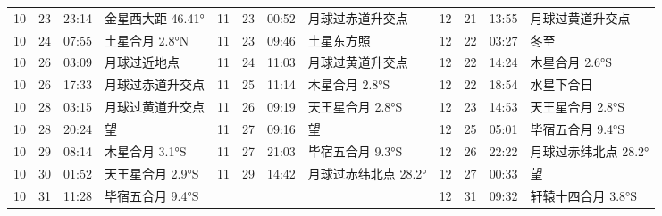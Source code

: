 \begin{tabular}{llll|llll|llll}
10 & 23 & 23:14 & 金星西大距 46.41° & 11 & 23 & 00:52 & 月球过赤道升交点 & 12 & 21 & 13:55 & 月球过黄道升交点 \tabularnewline
10 & 24 & 07:55 & 土星合月 2.8°N & 11 & 23 & 09:46 & 土星东方照 & 12 & 22 & 03:27 & 冬至 \tabularnewline
10 & 26 & 03:09 & 月球过近地点 & 11 & 24 & 11:03 & 月球过黄道升交点 & 12 & 22 & 14:24 & 木星合月 2.6°S \tabularnewline
10 & 26 & 17:33 & 月球过赤道升交点 & 11 & 25 & 11:14 & 木星合月 2.8°S & 12 & 22 & 18:54 & 水星下合日 \tabularnewline
10 & 28 & 03:15 & 月球过黄道升交点 & 11 & 26 & 09:19 & 天王星合月 2.8°S & 12 & 23 & 14:53 & 天王星合月 2.8°S \tabularnewline
10 & 28 & 20:24 & 望 & 11 & 27 & 09:16 & 望 & 12 & 25 & 05:01 & 毕宿五合月 9.4°S \tabularnewline
10 & 29 & 08:14 & 木星合月 3.1°S & 11 & 27 & 21:03 & 毕宿五合月 9.3°S & 12 & 26 & 22:22 & 月球过赤纬北点 28.2° \tabularnewline
10 & 30 & 01:52 & 天王星合月 2.9°S & 11 & 29 & 14:42 & 月球过赤纬北点 28.2° & 12 & 27 & 00:33 & 望 \tabularnewline
10 & 31 & 11:28 & 毕宿五合月 9.4°S &  &  &  &  & 12 & 31 & 09:32 & 轩辕十四合月 3.8°S \tabularnewline
\hline \end{tabular}
